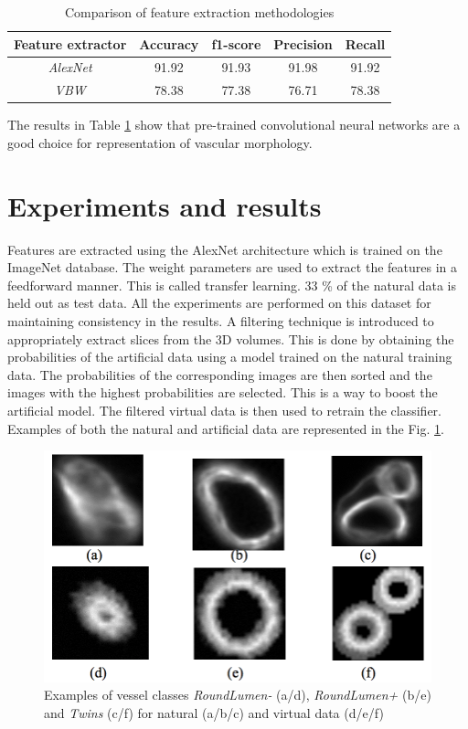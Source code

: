 \begin{table}[ht!]
\centering
\caption{Comparison of feature extraction methodologies}
\begin{tabular}{ | c | c | c | c | c |} 
\hline
Feature extractor  & Accuracy	& f1-score	 & Precision & Recall \\ 
\hline
\textit{AlexNet} & 91.92 & 91.93 & 91.98 & 91.92 \\ 
\hline
\textit{VBW} & 78.38	& 77.38 & 	76.71 & 78.38 \\
\hline
\end{tabular}
\label{table:FE}
\end{table}

The results in Table \ref{table:FE} show that pre-trained convolutional neural networks are a good choice for representation of vascular morphology.

\section{Experiments and results}
Features are extracted using the AlexNet architecture which is trained on the ImageNet \cite{deng2009imagenet} database. The weight parameters are used to extract the features in a feedforward manner. This is called transfer learning. 33 \% of the natural data is held out as test data. All the experiments are performed on this dataset for maintaining consistency in the results. 
A filtering technique is introduced to appropriately extract slices from the 3D volumes. This is done by obtaining the probabilities of the artificial data using a model trained on the natural training data. The probabilities of the corresponding images are then sorted and the images with the highest probabilities are selected. This is a way to boost the artificial model.  The filtered virtual data is then used to retrain the classifier. Examples of both the natural and artificial data are represented in the Fig. \ref{fig:slices}.

\begin{figure}[ht!]
\centering
\includegraphics[width=1.0\textwidth]{img/slices}
\caption{ Examples of vessel classes \textit{RoundLumen-} (a/d), \textit{RoundLumen+} (b/e) and \textit{Twins} (c/f) for natural (a/b/c) and virtual data (d/e/f)}
\label{fig:slices}
\end{figure}

